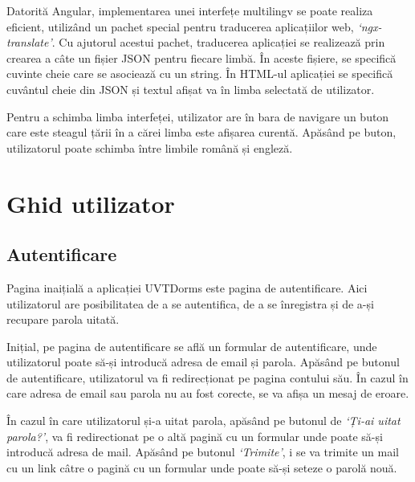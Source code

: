 \documentclass[12pt,a4paper]{report}
\theoremstyle{definition}
\theoremstyle{remark}
\begin{document}
\par Datorită Angular, implementarea unei interfețe multilingv se poate realiza eficient, utilizând un pachet special pentru traducerea aplicațiilor web, \textit{`ngx-translate'}\cite{ngx_translate}. Cu ajutorul acestui pachet, traducerea aplicației se realizează prin crearea a câte un fișier JSON pentru fiecare limbă. În aceste fișiere, se specifică cuvinte cheie care se asociează cu un string. În HTML-ul aplicației se specifică cuvântul cheie din JSON și textul afișat va în limba selectată de utilizator.

\par Pentru a schimba limba interfeței, utilizator are în bara de navigare un buton care este steagul țării în a cărei limba este afișarea curentă. Apăsând pe buton, utilizatorul poate schimba între limbile română și engleză.

\chapter{Ghid utilizator}

\section{Autentificare}

\par Pagina inaițială a aplicației UVTDorms este pagina de autentificare. Aici utilizatorul are posibilitatea de a se autentifica, de a se înregistra și de a-și recupare parola uitată.

\par Inițial, pe pagina de autentificare se află un formular de autentificare, unde utilizatorul poate să-și introducă adresa de email și parola. Apăsând pe butonul de autentificare, utilizatorul va fi redirecționat pe pagina contului său. În cazul în care adresa de email sau parola nu au fost corecte, se va afișa un mesaj de eroare.


\par În cazul în care utilizatorul și-a uitat parola, apăsând pe butonul de \textit{`Ți-ai uitat parola?'}, va fi redirectionat pe o altă pagină cu un formular unde poate să-și introducă adresa de mail. Apăsând pe butonul \textit{`Trimite'}, i se va trimite un mail cu un link câtre o pagină cu un formular unde poate să-și seteze o parolă nouă.

\end{document}
